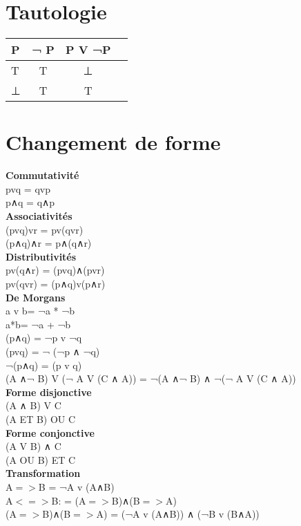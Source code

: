 \section{Tautologie}
\begin{tabular}{|l|c|c|c|}
  \hline
  P & ¬ P & P V ¬P \\
  \hline
  T & T & ⊥ \\
  ⊥ & T & T \\
  \hline
\end{tabular}

\newpage
\section{Changement de forme}
\vspace{5mm} %
\textbf{Commutativité} \\
pvq = qvp \\
p∧q = q∧p \\

\vspace{5mm} %
\textbf{Associativités} \\
(pvq)vr = pv(qvr) \\
(p∧q)∧r = p∧(q∧r) \\

\vspace{5mm} %
\textbf{Distributivités} \\
pv(q∧r) = (pvq)∧(pvr) \\
pv(qvr) = (p∧q)v(p∧r) \\

\vspace{5mm} %
\textbf{De Morgans} \\
a v b= ¬a * ¬b\\
a*b= ¬a + ¬b\\
(p∧q) = ¬p v ¬q  \\
(pvq) = ¬ (¬p ∧ ¬q)  \\
¬(p∧q) = (p v q)  \\
(A ∧¬ B) V (¬ A V (C ∧ A)) =  ¬(A ∧¬ B) ∧ ¬(¬ A V (C ∧ A))\\

\vspace{5mm} %
\textbf{Forme disjonctive} \\
(A ∧ B) V C\\
(A ET B) OU C \\

\vspace{5mm} %
\textbf{Forme conjonctive} \\
(A V B) ∧ C\\
(A OU B) ET C \\

\vspace{5mm} %
\textbf{Transformation} \\
A$=>$B = ¬A v (A∧B) \\
A$<=>$B: = (A$=>$B)∧(B$=>$A)  \\
(A$=>$B)∧(B$=>$A) = (¬A v (A∧B)) ∧ (¬B v (B∧A))
